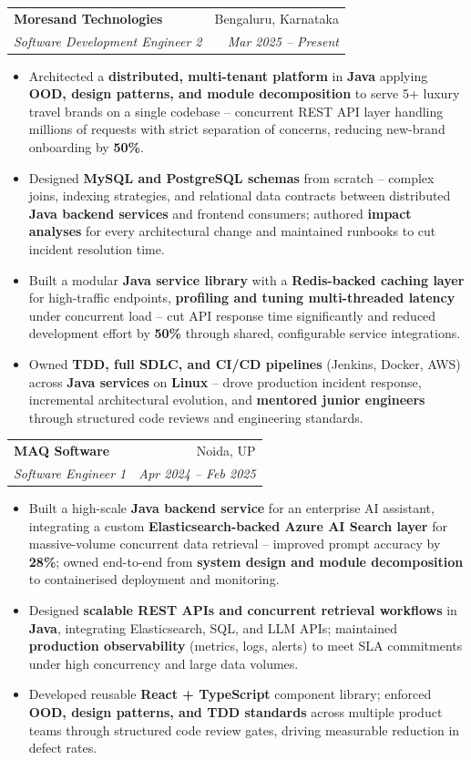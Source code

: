 \documentclass[a4paper,20pt]{article}
\makeatletter
\newcommand{\resumeSubheading}[4]{\vspace{-1pt}\item\begin{tabular*}{0.97\textwidth}{l@{\extracolsep{\fill}}r}\textbf{#1} & #2 \\\textit{#3} & \textit{#4} \\\end{tabular*}\vspace{-5pt}}
\newcommand{\resumeItemListStart}{\begin{itemize}}
\newcommand{\resumeItemListEnd}{\end{itemize}\vspace{-5pt}}
\makeatother
\begin{document}
    \resumeSubheading
      {Moresand Technologies}{Bengaluru, Karnataka}
      {Software Development Engineer 2}{Mar 2025 -- Present}
      \resumeItemListStart
        \item\small{Architected a \textbf{distributed, multi-tenant platform} in \textbf{Java} applying \textbf{OOD, design patterns, and module decomposition} to serve 5+ luxury travel brands on a single codebase -- concurrent REST API layer handling millions of requests with strict separation of concerns, reducing new-brand onboarding by \textbf{50\%}.}
        \item\small{Designed \textbf{MySQL and PostgreSQL schemas} from scratch -- complex joins, indexing strategies, and relational data contracts between distributed \textbf{Java backend services} and frontend consumers; authored \textbf{impact analyses} for every architectural change and maintained runbooks to cut incident resolution time.}
        \item\small{Built a modular \textbf{Java service library} with a \textbf{Redis-backed caching layer} for high-traffic endpoints, \textbf{profiling and tuning multi-threaded latency} under concurrent load -- cut API response time significantly and reduced development effort by \textbf{50\%} through shared, configurable service integrations.}
        \item\small{Owned \textbf{TDD, full SDLC, and CI/CD pipelines} (Jenkins, Docker, AWS) across \textbf{Java services} on \textbf{Linux} -- drove production incident response, incremental architectural evolution, and \textbf{mentored junior engineers} through structured code reviews and engineering standards.}
      \resumeItemListEnd

    \resumeSubheading
      {MAQ Software}{Noida, UP}
      {Software Engineer 1}{Apr 2024 -- Feb 2025}
      \resumeItemListStart
        \item\small{Built a high-scale \textbf{Java backend service} for an enterprise AI assistant, integrating a custom \textbf{Elasticsearch-backed Azure AI Search layer} for massive-volume concurrent data retrieval -- improved prompt accuracy by \textbf{28\%}; owned end-to-end from \textbf{system design and module decomposition} to containerised deployment and monitoring.}
        \item\small{Designed \textbf{scalable REST APIs and concurrent retrieval workflows} in \textbf{Java}, integrating Elasticsearch, SQL, and LLM APIs; maintained \textbf{production observability} (metrics, logs, alerts) to meet SLA commitments under high concurrency and large data volumes.}
        \item\small{Developed reusable \textbf{React + TypeScript} component library; enforced \textbf{OOD, design patterns, and TDD standards} across multiple product teams through structured code review gates, driving measurable reduction in defect rates.}
      \resumeItemListEnd
\end{document}
